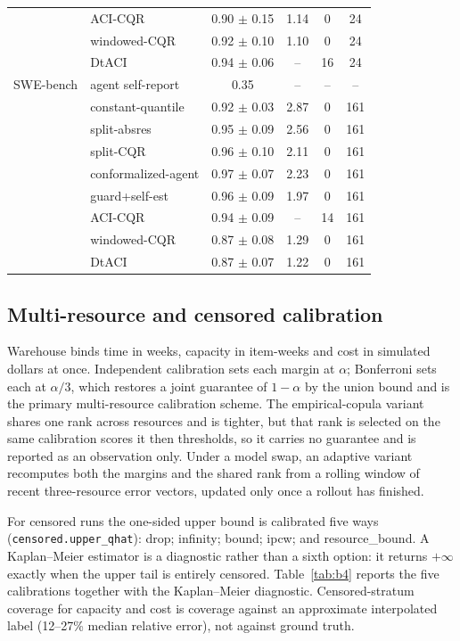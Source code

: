 \documentclass{article}
\begin{document}
\begin{table}[t]
\begin{tabular}{llcccc}
     & ACI-CQR & 0.90 $\pm$ 0.15 & 1.14 & 0 & 24 \\
     & windowed-CQR & 0.92 $\pm$ 0.10 & 1.10 & 0 & 24 \\
     & DtACI & 0.94 $\pm$ 0.06 & -- & 16 & 24 \\
    \midrule
    SWE-bench & agent self-report & 0.35 & -- & -- & -- \\
     & constant-quantile & 0.92 $\pm$ 0.03 & 2.87 & 0 & 161 \\
     & split-absres & 0.95 $\pm$ 0.09 & 2.56 & 0 & 161 \\
     & split-CQR & 0.96 $\pm$ 0.10 & 2.11 & 0 & 161 \\
     & conformalized-agent & 0.97 $\pm$ 0.07 & 2.23 & 0 & 161 \\
     & guard+self-est & 0.96 $\pm$ 0.09 & 1.97 & 0 & 161 \\
     & ACI-CQR & 0.94 $\pm$ 0.09 & -- & 14 & 161 \\
     & windowed-CQR & 0.87 $\pm$ 0.08 & 1.29 & 0 & 161 \\
     & DtACI & 0.87 $\pm$ 0.07 & 1.22 & 0 & 161 \\
    \bottomrule
  \end{tabular}
\end{table}

\subsection{Multi-resource and censored calibration}
\label{app:joint}

Warehouse binds time in weeks, capacity in item-weeks and cost in simulated dollars at
once. Independent calibration sets each margin at $\alpha$; Bonferroni sets each at
$\alpha/3$, which restores a joint guarantee of $1{-}\alpha$ by the union bound and is
the primary multi-resource calibration scheme. The empirical-copula variant shares one
rank across resources and is tighter, but that rank is selected on the same calibration
scores it then thresholds, so it carries no guarantee and is reported as an observation
only. Under a model swap, an adaptive variant recomputes both the margins and the
shared rank from a rolling window of recent three-resource error vectors, updated only
once a rollout has finished.

For censored runs the one-sided upper bound is calibrated five ways
(\texttt{censored.upper\_qhat}): drop; infinity; bound; ipcw; and resource\_bound. A
Kaplan--Meier estimator \cite{kaplan1958nonparametric} is a diagnostic rather than a
sixth option: it returns $+\infty$ exactly when the upper tail is entirely censored.
Table~\ref{tab:b4} reports the five calibrations together with the Kaplan--Meier
diagnostic. Censored-stratum coverage for capacity and cost is coverage against an
approximate interpolated label (12--27\% median relative error), not against ground
truth.
\end{document}
